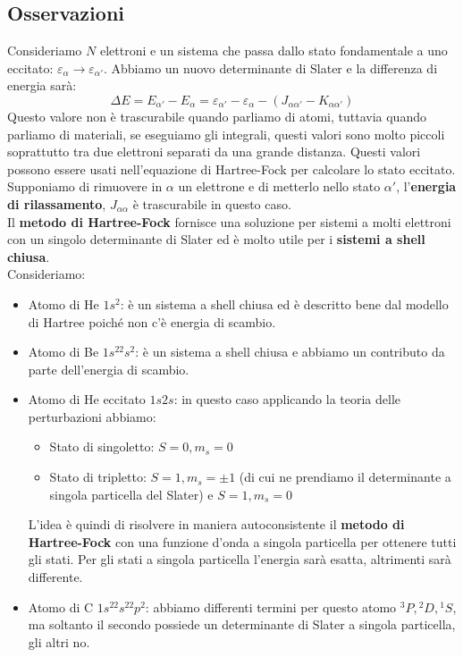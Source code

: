 \subsection*{Osservazioni}
Consideriamo $N$ elettroni e un sistema che passa dallo stato fondamentale a uno eccitato: $\varepsilon_\alpha \rightarrow \varepsilon_{\alpha'}$. Abbiamo un nuovo determinante di Slater e la differenza di energia sarà:
\begin{equation*}
    \Delta E = E_{\alpha'}-E_\alpha=\varepsilon_{\alpha'}-\varepsilon_\alpha - (J_{\alpha\alpha'}-K_{\alpha\alpha'})
\end{equation*}
Questo valore non è trascurabile quando parliamo di atomi, tuttavia quando parliamo di materiali, se eseguiamo gli integrali, questi valori sono molto piccoli soprattutto tra due elettroni separati da una grande distanza. Questi valori possono essere usati nell'equazione di Hartree-Fock per calcolare lo stato eccitato. Supponiamo di rimuovere in $\alpha$ un elettrone e di metterlo nello stato $\alpha'$, l'\textbf{energia di rilassamento}, $J_{\alpha\alpha}$ è trascurabile in questo caso.\\
Il \textbf{metodo di Hartree-Fock} fornisce una soluzione per sistemi a molti elettroni con un singolo determinante di Slater ed è molto utile per i \textbf{sistemi a shell chiusa}.\\
Consideriamo:
\begin{itemize}
    \item Atomo di He $1s^2$: è un sistema a shell chiusa ed è descritto bene dal modello di Hartree poiché non c'è energia di scambio.
    \item Atomo di Be $1s^22s^2$: è un sistema a shell chiusa e abbiamo un contributo da parte dell'energia di scambio.
    \item Atomo di He eccitato $1s2s$: in questo caso applicando la teoria delle perturbazioni abbiamo:
    \begin{itemize}
        \item Stato di singoletto: $S=0, m_s=0$
        \item Stato di tripletto: $S=1, m_s=\pm 1$ (di cui ne prendiamo il determinante a singola particella del Slater) e $S=1, m_s= 0$
    \end{itemize}
    L'idea è quindi di risolvere in maniera autoconsistente il \textbf{metodo di Hartree-Fock} con una funzione d'onda a singola particella per ottenere tutti gli stati. Per gli stati a singola particella l'energia sarà esatta, altrimenti sarà differente.
    \item Atomo di C $1s^22s^22p^2$: abbiamo differenti termini per questo atomo ${}^3P, {}^2D, {}^1S$, ma soltanto il secondo possiede un determinante di Slater a singola particella, gli altri no.
\end{itemize}

